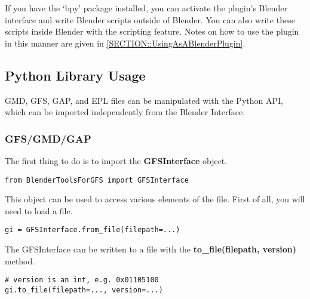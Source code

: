 \documentclass{article}
\begin{document}
If you have the `bpy' package installed, you can activate the plugin's Blender interface and write Blender scripts outside of Blender. You can also write these scripts inside Blender with the scripting feature. Notes on how to use the plugin in this manner are given in \ref{SECTION::UsingAsABlenderPlugin}.

\subsection{Python Library Usage}
\label{SECTION::UsingAsAPythonLibrary}
GMD, GFS, GAP, and EPL files can be manipulated with the Python API, which can be imported independently from the Blender Interface.

\subsubsection{GFS/GMD/GAP}
The first thing to do is to import the \textbf{GFSInterface} object.
\begin{lstlisting}[style=pythonstyling]
from BlenderToolsForGFS import GFSInterface
\end{lstlisting}
This object can be used to access various elements of the file. First of all, you will need to load a file.
\begin{lstlisting}[style=pythonstyling]
gi = GFSInterface.from_file(filepath=...) 
\end{lstlisting}
The GFSInterface can be written to a file with the \textbf{to\_file(filepath, version)} method.
\begin{lstlisting}[style=pythonstyling]
# version is an int, e.g. 0x01105100
gi.to_file(filepath=..., version=...)
\end{lstlisting}
\end{document}

